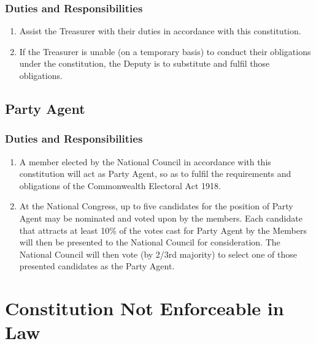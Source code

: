 \documentclass[a4paper,titlepage,8.5pt]{article}
\begin{document}
\subsubsection{Duties and Responsibilities}

\begin{enumerate}
\item Assist the Treasurer with their duties in accordance with this constitution.
\item If the Treasurer is unable (on a temporary basis) to conduct their obligations under the constitution, the Deputy is to substitute and fulfil those obligations.
\end{enumerate}

\subsection{Party Agent}

\subsubsection{Duties and Responsibilities}
\begin{enumerate}
\item A member elected by the National Council in accordance with this constitution will act as Party Agent, so as to fulfil the requirements and obligations of the Commonwealth Electoral Act 1918.
\item At the National Congress, up to five candidates for the position of Party Agent may be nominated and voted upon by the members. Each candidate that attracts at least 10\% of the votes cast for Party Agent by the Members will then be presented to the National Council for consideration. The National Council will then vote (by 2/3rd majority) to select one of those presented candidates as the Party Agent.
\end{enumerate}

\section{Constitution Not Enforceable in Law}
\end{document}
